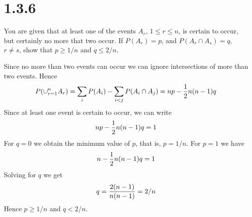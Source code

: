 \section*{1.3.6}
You are given that at least one of the events $A_r$, $1\le r\le n$, is certain to occur,
but certainly no more that two occur.
If $P(A_r)=p$, and $P(A_r\cap A_s)=q$, $r\ne s$, show that $p\ge1/n$ and
$q\le2/n$.

\bigskip
\noindent
Since no more than two events can occur we can ignore intersections of more than
two events. Hence
$$P(\cup_{r=1}^n A_r)=\sum_iP(A_i)-\sum_{i<j}P(A_i\cap A_j)=np-{1\over2}n(n-1)q$$
Since at least one event is certain to occur, we can write
$$np-{1\over2}n(n-1)q=1$$
For $q=0$ we obtain the minimum value of $p$, that is, $p=1/n$.
For $p=1$ we have
$$n-{1\over2}n(n-1)q=1$$
Solving for $q$ we get
$$q={2(n-1)\over n(n-1)}=2/n$$
Hence $p\ge1/n$ and $q<2/n$.
